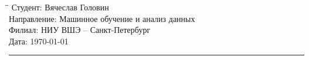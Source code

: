 \begin{tabbing}
\hspace{10cm}\=\hspace{1in}\=\kill
  \> Студент: \> Вячеслав Головин\\
  \> Направление: \> Машинное обучение и анализ данных\\
  \> Филиал: \> НИУ ВШЭ -- Санкт-Петербург\\
  \> Дата: \> \today
\end{tabbing}
\hrule
\vspace{1cm}

